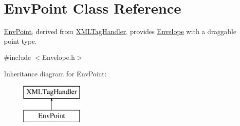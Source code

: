 \hypertarget{class_env_point}{}\section{Env\+Point Class Reference}
\label{class_env_point}


\hyperlink{class_env_point}{Env\+Point}, derived from \hyperlink{class_x_m_l_tag_handler}{X\+M\+L\+Tag\+Handler}, provides \hyperlink{class_envelope}{Envelope} with a draggable point type.  




{\ttfamily \#include $<$Envelope.\+h$>$}

Inheritance diagram for Env\+Point\+:\begin{figure}[H]
\begin{center}
\leavevmode
\includegraphics[height=2.000000cm]{class_env_point}
\end{center}
\end{figure}
